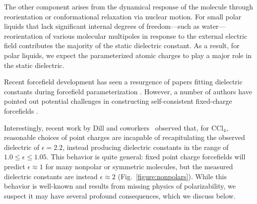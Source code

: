 \documentclass[aip, jcp, reprint]{revtex4-1}  %
\begin{document}
The other component arises from the dynamical response of the molecule through reorientation or conformational relaxation via nuclear motion.
For small polar liquids that lack significant internal degrees of freedom---such as water---reorientation of various molecular multipoles in response to the external electric field contributes the majority of the static dielectric constant. 
As a result, for polar liquids, we expect the parameterized atomic charges to play a major role in the static dielectric.  

Recent forcefield development has seen a resurgence of papers fitting dielectric constants during forcefield parameterization \cite{wang2014building, fennell2014fixed}.  
However, a number of authors have pointed out potential challenges in constructing self-consistent fixed-charge forcefields \cite{fennell2012simple, leontyev2014polarizable}.  


Interestingly, recent work by Dill and coworkers~\cite{fennell2012simple} observed that, for $\mathrm{CCl_4}$, reasonable choices of point charges are incapable of recapitulating the observed dielectric of $\epsilon = 2.2$, instead producing dielectric constants in the range of $1.0 \le \epsilon \le 1.05$.  
This behavior is quite general: fixed point charge forcefields will predict $\epsilon \approx 1$ for many nonpolar or symmetric molecules, but the measured dielectric constants are instead $\epsilon \approx 2$ (Fig.~\ref{figure:nonpolars}).  
While this behavior is well-known and results from missing physics of polarizability, we suspect it may have several profound consequences, which we discuss below.


\end{document}
